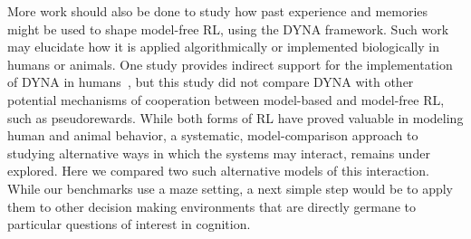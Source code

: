 \documentclass[notitlepage]{article}
\begin{document}
More work should also be done to study how past experience and memories might be used to shape model-free RL, using the DYNA framework. Such work may elucidate how it is applied algorithmically or implemented biologically in humans or animals. One study provides indirect support for the implementation of DYNA in humans~\cite{gershman2014retrospective}, but this study did not compare DYNA with other potential mechanisms of cooperation between model-based and model-free RL, such as pseudorewards. While both forms of RL have proved valuable in modeling human and animal behavior, a systematic, model-comparison approach to studying alternative ways in which the systems may interact, remains under explored. Here we compared two such alternative models of this interaction. While our benchmarks use a maze setting, a next simple step would be to apply them to other decision making environments that are directly germane to particular questions of interest in cognition.

{}

\end{document}

